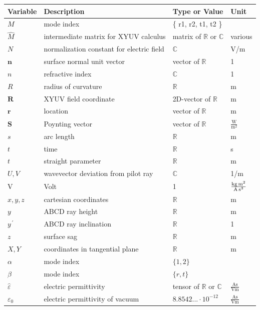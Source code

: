\documentclass[12pt,a4paper,twoside,openright,BCOR10mm,headsepline,titlepage,abstracton,chapterprefix,final]{scrreprt}
\newcommand\Vector[1]{{\mathbf{#1}}}
\newcommand\vacuum{0}
\newcommand\Tensor[1]{\hat{#1}}
\newcommand\permittivity{\Tensor{\scalarpermittivity}}
\newcommand\vacuumpermittivity{\scalarpermittivity_{\vacuum}}
\newcommand\scalarpermittivity{\varepsilon}
\newcommand\meter{\textrm{m}}
\newcommand\second{\textrm{s}}
\newcommand\ampere{\textrm{A}}
\newcommand\volt{\textrm{V}}
\newcommand\watt{\textrm{W}}
\begin{document}
\begin{tabular}{l|l|l|l}
 Variable & Description & Type or Value & Unit \\
 \hline
 $M$ & mode index &\{ r1, r2, t1, t2 \}&\\
 $\hat{M}$ & intermediate matrix for XYUV calculus & matrix of $\mathbb{R}$ or $\mathbb{C}$ & various\\
 \hline
 $N$ & normalization constant for electric field & $\mathbb{C}$ & \volt /\meter \\
 \hline
 $\Vector{n}$ & surface normal unit vector & vector of $\mathbb{R}$ & 1\\
 $n$ & refractive index & $\mathbb{C}$ & 1\\
 \hline
 $R$ & radius of curvature & $\mathbb{R}$ & \meter \\
 $\Vector{R}$ & XYUV field coordinate & 2D-vector of $\mathbb{R}$ & \meter \\ 
 $\Vector{r}$ & location & vector of $\mathbb{R}$ & \meter \\
 \hline
 $\Vector{S}$ & Poynting vector & vector of $\mathbb{R}$ & $\frac{\watt}{\meter^2}$\\
 $s$ & arc length & $\mathbb{R}$ & \meter \\
 \hline
 $t$ & time & $\mathbb{R}$ & \second \\
 $t$ & straight parameter & $\mathbb{R}$ & \meter \\
 \hline
 $U,V$ & wavevector deviation from pilot ray & $\mathbb{C}$ & 1/\meter \\
 \volt & Volt & 1 & $\frac{\textrm{kg\,m}^2}{\textrm{A\,s}^3}$ \\
 \hline
 $x,y,z$ & cartesian coordinates & $\mathbb{R}$ & \meter \\
 $y$ & ABCD ray height & $\mathbb{R}$ & \meter \\
 $y^{\,\prime}$ & ABCD ray inclination& $\mathbb{R}$ & 1\\
 $z$ & surface sag & $\mathbb{R}$ & \meter \\
 \hline
 $X,Y$ & coordinates in tangential plane& $\mathbb{R}$ & \meter \\
 \hline
 $\alpha$ & mode index & $\{ 1, 2 \}$ & \\
 \hline 
 $\beta$ & mode index & $\{ r, t \}$ & \\
 \hline
 $\permittivity$ & electric permittivity & tensor of $\mathbb{R}$ or $\mathbb{C}$ & $\frac{\ampere \second}{\volt \meter}$ \\
 $\vacuumpermittivity$ & electric permittivity of vacuum & $8.8542...\cdot 10^{-12}$ & $\frac{\ampere \second}{\volt \meter}$ \\

\end{tabular}
\end{document}
